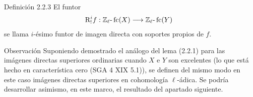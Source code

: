 \begin{statement}{Definición 2.2.3}
El funtor
\[
\mathrm{R}^i_!f:\mathbb Z_\ell\text{-}\operatorname{fc}(X)\longrightarrow \mathbb Z_\ell\text{-}\operatorname{fc}(Y)
\]
se llama \(i\)-ésimo funtor de imagen directa con soportes propios de \(f\).
\end{statement}

\begin{statement}{Observación}
Suponiendo demostrado el análogo del lema (2.2.1) para las imágenes directas superiores ordinarias cuando \(X\) e \(Y\) son excelentes (lo que está hecho en característica cero (SGA 4 XIX 5.1)), se definen del mismo modo en este caso imágenes directas superiores en cohomología \(\ell\)-ádica. Se podría desarrollar asimismo, en este marco, el resultado del apartado siguiente.
\end{statement}
